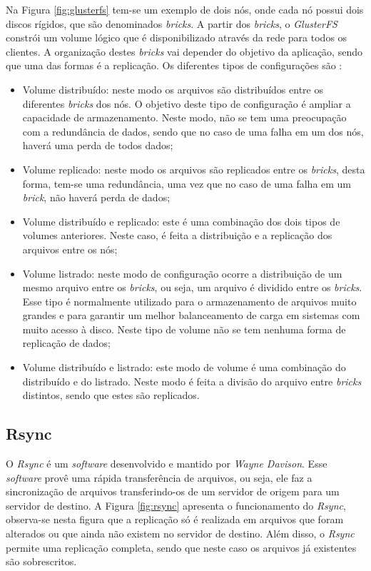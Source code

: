 Na Figura \ref{fig:glusterfs} tem-se um exemplo de dois nós, onde cada nó possui dois discos rígidos, que são denominados \textit{bricks}. 
A partir dos \textit{bricks}, o \textit{GlusterFS} constrói um volume lógico que é disponibilizado através da rede para todos os clientes. 
A organização destes \textit{bricks} vai depender do objetivo da aplicação, sendo que uma das formas é a replicação. 
Os diferentes tipos de configurações são \cite{glusterfs}:
\begin{itemize}
 \item Volume distribuído: neste modo os arquivos são distribuídos entre os diferentes \textit{bricks} dos nós. O objetivo deste tipo de 
 configuração é ampliar a capacidade de armazenamento. Neste modo, não se tem uma preocupação com a redundância de dados, sendo que no caso de uma
 falha em um dos nós, haverá uma perda de todos dados;
 \item Volume replicado: neste modo os arquivos são replicados entre os \textit{bricks}, desta forma, tem-se uma redundância, uma vez que no caso
 de uma falha em um \textit{brick}, não haverá perda de dados;
 \item Volume distribuído e replicado: este é uma combinação dos dois tipos de volumes anteriores. Neste caso, é feita a distribuição 
 e a replicação dos arquivos entre os nós;
 \item Volume listrado: neste modo de configuração ocorre a distribuição de um mesmo arquivo entre os \textit{bricks}, ou seja, um arquivo é 
 dividido entre os \textit{bricks}. Esse tipo é normalmente utilizado para o armazenamento de arquivos muito grandes e para garantir um melhor 
 balanceamento de carga em sistemas com muito acesso à disco. Neste tipo de volume não se tem nenhuma forma de replicação de dados;
 \item Volume distribuído e listrado: este modo de volume é uma combinação do distribuído e do listrado. Neste modo é feita a divisão do arquivo 
 entre \textit{bricks} distintos, sendo que estes são replicados.
\end{itemize}

\subsection{Rsync}
\label{section:rsync}
O \textit{Rsync} \cite{rsync} é um \textit{software} desenvolvido e mantido por \textit{Wayne Davison}. Esse \textit{software} provê uma rápida
transferência de arquivos, ou seja, ele faz a sincronização de arquivos transferindo-os de um servidor de origem para um servidor de destino. 
A Figura \ref{fig:rsync} apresenta o funcionamento do \textit{Rsync}, observa-se nesta figura que a replicação só é realizada em arquivos 
que foram alterados ou que ainda não existem no servidor de destino. Além disso, o \textit{Rsync} permite uma replicação completa, 
sendo que neste caso os arquivos já existentes são sobrescritos.


